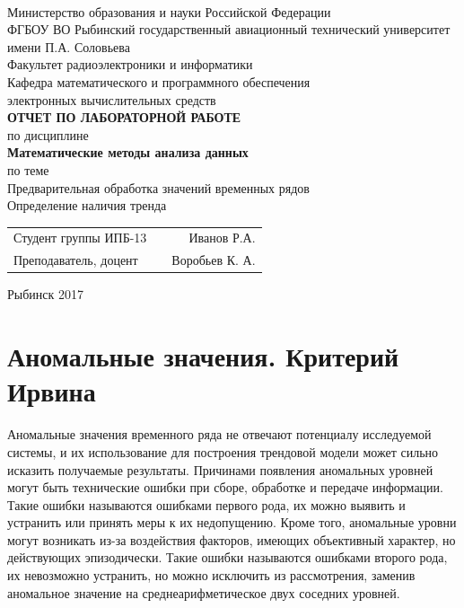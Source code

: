 \documentclass[a4paper,12pt]{article}
\begin{document}
\begin{titlepage}
\newpage

\

\begin{center}
	\large		
   	Министерство образования и науки Российской Федерации\\[0.5cm]
    	
	ФГБОУ ВО Рыбинский государственный авиационный технический университет имени П.А. Соловьева\\[1.0cm]

	Факультет радиоэлектроники и информатики\\[0.25cm]
		
	Кафедра математического и программного обеспечения\\ электронных вычислительных средств\\[1.5cm]

	\Large
	\textbf{\textsc{ОТЧЕТ ПО ЛАБОРАТОРНОЙ РАБОТЕ}}\\[0.25cm]
	по  дисциплине\\
	\textbf{Математические методы анализа данных}\\[0.5cm]
	
	по теме\\
	Предварительная обработка значений временных рядов\\ Определение наличия тренда

\end{center}

\vfill	
\begin{tabularx}{0.95\textwidth}{lXr}
Студент группы ИПБ-13 			& &	Иванов Р.А. \\
Преподаватель, доцент	& & Воробьев К. А.\\
\end{tabularx}

\vspace{1.5cm}
\center Рыбинск 2017
\end{titlepage}	


\newpage
\setcounter{page}{2}

\tableofcontents

\newpage\section{Аномальные значения. Критерий Ирвина}
Аномальные значения временного ряда не отвечают потенциалу исследуемой системы, и их использование для построения трендовой модели может сильно исказить получаемые результаты. Причинами появления аномальных уровней могут быть технические ошибки при сборе, обработке и передаче информации. Такие ошибки называются ошибками первого рода, их можно выявить и устранить или принять меры к их недопущению. Кроме того, аномальные уровни могут возникать из-за воздействия факторов, имеющих объективный характер, но действующих эпизодически. Такие ошибки называются ошибками второго рода, их невозможно устранить, но можно исключить из рассмотрения, заменив аномальное значение на среднеарифметическое двух соседних уровней.
\end{document}
